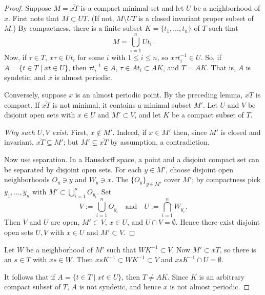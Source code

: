 \begin{proof}
    Suppose $M = \overline{xT}$ is a compact minimal set and let $U$ be a neighborhood of $x$. First note that $M \subset UT$. (If not, $M \setminus UT$ is a closed invariant proper subset of $M$.) By compactness, there is a finite subset $K = \{t_1, \ldots, t_n\}$ of $T$ such that
    \[
        M = \bigcup_{i=1}^{n} Ut_i.
    \]
    Now, if $\tau \in T$, $x\tau \in Ut_i$ for some $i$ with $1 \le i \le n$, so $x\tau t_i^{-1} \in U$. So, if $A = \{t \in T \mid xt \in U\}$, then $\tau t_i^{-1} \in A$, $\tau \in At_i \subset AK$, and $T = AK$. That is, $A$ is syndetic, and $x$ is almost periodic.

    Conversely, suppose $x$ is an almost periodic point. By the preceding lemma, $\overline{xT}$ is compact. If $\overline{xT}$ is not minimal, it contains a minimal subset $M'$. Let $U$ and $V$ be disjoint open sets with $x \in U$ and $M' \subset V$, and let $K$ be a compact subset of $T$.
    \begin{mynote}
        \begin{proof}[Why such $U,V$ exist]
            First, $x\notin M'$. Indeed, if $x\in M'$ then, since $M'$ is closed and invariant,
            $\overline{xT}\subseteq M'$; but $M'\subsetneq \overline{xT}$ by assumption, a contradiction.

            Now use separation. In a Hausdorff space, a point and a disjoint compact set can be
            separated by disjoint open sets. For each $y\in M'$, choose disjoint open
            neighborhoods $O_y\ni y$ and $W_y\ni x$. The $\{O_y\}_{y\in M'}$ cover $M'$; by
            compactness pick $y_1,\dots,y_n$ with $M'\subset \bigcup_{i=1}^n O_{y_i}$. Set
            \[
                V:=\bigcup_{i=1}^n O_{y_i}\quad\text{and}\quad U:=\bigcap_{i=1}^n W_{y_i}.
            \]
            Then $V$ and $U$ are open, $M'\subset V$, $x\in U$, and $U\cap V=\emptyset$. Hence
            there exist disjoint open sets $U,V$ with $x\in U$ and $M'\subset V$.
        \end{proof}
    \end{mynote}
    Let $W$ be a neighborhood of $M'$ such that $WK^{-1} \subset V$. Now $M' \subset \overline{xT}$, so there is an $s \in T$ with $xs \in W$. Then $xsK^{-1} \subset WK^{-1} \subset V$ and $xsK^{-1} \cap U = \emptyset$.

    It follows that if $A = \{t \in T \mid xt \in U\}$, then $T \ne AK$. Since $K$ is an arbitrary compact subset of $T$, $A$ is not syndetic, and hence $x$ is not almost periodic.
\end{proof}



